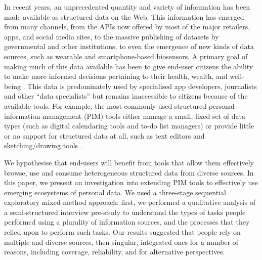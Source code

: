 \documentclass{sigchi}
\begin{document}
In recent years, an unprecedented quantity and variety of information has been made available as structured data on the Web.  This information has emerged from many channels, from the APIs now offered by most of the major retailers, apps, and social media sites, to the massive publishing of datasets by governmental and other institutions, to even the emergence of new kinds of data sources, such as wearable and smartphone-based biosensors.  A primary goal of making much of this data available has been to give end-user citizens the ability to make more informed decisions pertaining to their health, wealth, and well-being \cite{Shadbolt:2006:SWR:1155313.1155373}.  This data is predominately used by specialised app developers, journalists and other ``data specialists'' but remains inaccessible to citizens because of the available tools.  For example, the most commonly used structured personal information management (PIM) tools either manage a small, fixed set of data types (such as digital calendaring tools and  to-do list managers) or provide little or no support for structured data at all, such as text editors and sketching/drawing tools \cite{}.   

We hypothesise that end-users will benefit from tools that allow them effectively browse, use and consume heterogeneous structured data from diverse sources. In this paper, we present an investigation into extending PIM tools to effectively use emerging ecosystems of personal data.  We used a three-stage sequential exploratory mixed-method approach: first, we performed a qualitative analysis of a semi-structured interview pre-study to understand the types of tasks people performed using a plurality of information sources, and the processes that they relied upon to perform such tasks.  Our results suggested that people rely on multiple and diverse sources, then singular, integrated ones for a number of reasons, including coverage, reliability, and for alternative perspectives.  

\end{document}
